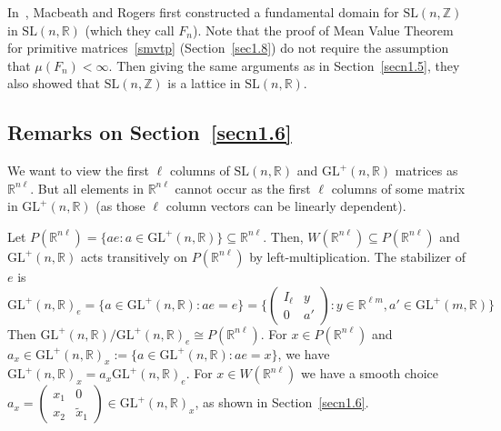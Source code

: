 \documentclass[11pt]{article}
\theoremstyle{definition}
\begin{document}
In~\cite{macbeathrogers58}, Macbeath and Rogers first constructed a fundamental domain for $\mathrm{SL}(n,\mathbb{Z})$ in $\mathrm{SL}(n,\mathbb{R})$ (which they call $F_n$).
Note that the proof of Mean Value Theorem for primitive matrices~\ref{smvtp} (Section~\ref{sec1.8}) do not require the assumption that $ \mu (F_n) < \infty$.
Then giving the same arguments as in Section~\ref{secn1.5}, they also showed that $\mathrm{SL}(n,\mathbb{Z})$ is a lattice in $\mathrm{SL}(n,\mathbb{R})$.

\subsection{Remarks on Section~\ref{secn1.6}}\label{1.9.2}
We want to view the first $\ell$ columns of $\mathrm{SL}(n,\mathbb{R})$ and $\mathrm{GL}^+(n,\mathbb{R})$ matrices as $\mathbb{R}^{n \ell }$.
But all elements in $\mathbb{R}^{n \ell }$ cannot occur as the first $\ell$ columns of some matrix in $\mathrm{GL}^+(n,\mathbb{R})$ (as those $\ell$ column vectors can be linearly dependent).

Let $P(\mathbb{R}^{n\ell }) = \{ae : a \in \mathrm{GL}^+(n, \mathbb{R})\} \subseteq \mathbb{R}^{n \ell }$.
Then, $W(\mathbb{R}^{n\ell}) \subseteq P(\mathbb{R}^{n\ell})$ and $\mathrm{GL}^+(n,\mathbb{R})$ acts transitively on $P(\mathbb{R}^{n\ell })$ by left-multiplication.
The stabilizer of $e$ is
\[
    {\mathrm{GL}^+(n, \mathbb{R})}_e = \{a \in \mathrm{GL}^+(n, \mathbb{R}) : ae = e\} = \bigg\{
    \begin{pmatrix}
        I_ \ell  & y  \\
        0        & a'
    \end{pmatrix}
    : y \in \mathbb{R}^{ \ell m}, a' \in \mathrm{GL}^+(m, \mathbb{R})\bigg\}
\]
Then $\mathrm{GL}^+(n, \mathbb{R})/{\mathrm{GL}^+(n, \mathbb{R})}_e \cong P(\mathbb{R}^{n\ell })$.
For $x \in P(\mathbb{R}^{n\ell })$ and $a_x \in {\mathrm{GL}^+(n, \mathbb{R})}_x := \{a \in \mathrm{GL}^+(n, \mathbb{R}) : ae = x\}$, we have ${\mathrm{GL}^+(n, \mathbb{R})}_x = a_x {\mathrm{GL}^+(n, \mathbb{R})}_e$.
For $x \in W(\mathbb{R}^{n\ell })$ we have a smooth choice $a_x =
\begin{pmatrix}
    x_1 & 0	\\
    x_2 & \widetilde{x}_1
\end{pmatrix}
\in {\mathrm{GL}^+(n, \mathbb{R})}_x$, as shown in Section~\ref{secn1.6}.



\end{document}
